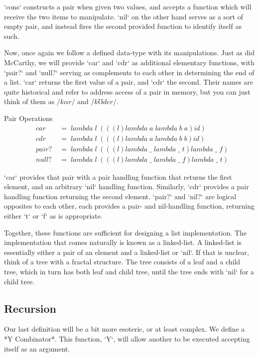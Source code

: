 `cons` constructs a pair when given two values, and accepts a function which will 
receive the two items to manipulate. `nil` on the other hand serves as a sort of 
empty pair, and instead fires the second provided function to identify itself as 
such.

Now, once again we follow a defined data-type with its manipulations. Just as did 
McCarthy, we will provide `car` and `cdr` as additional elementary functions, with 
`pair?` and `null?` serving as complements to each other in determining the end of 
a list. `car` returns the first value of a pair, and `cdr` the second. Their names 
are quite historical and refer to address access of a pair in memory, but you can 
just think of them as $/k \alpha r/$ and $/k \mho d e r/$.

Pair Operations
\begin{align*}
& car \; &= \; lambda \; l \; (((l)lambda \; a \; lambda \; b \; a)id)
\\& cdr \; &= \; lambda \; l \; (((l)lambda \; a \; lambda \; b \; b)id)
\\& pair? \; &= \; lambda \; l \; (((l)lambda \; \_ \; lambda \; \_ \; t)lambda \; \_ \; f)
\\& null? \; &= \; lambda \; l \; (((l)lambda \; \_ \; lambda \; \_ \; f)lambda \; \_ \; t)
\end{align*}

`car` provides that pair with a pair handling function that returns the first 
element, and an arbitrary `nil` handling function. Similarly, `cdr` provides a 
pair handling function returning the second element. `pair?` and `nil?` are 
logical opposites to each other, each provides a pair- and nil-handling function, 
returning either `t` or `f` as is appropriate.

Together, these functions are sufficient for designing a list implementation. The 
implementation that comes naturally is known as a linked-list. A linked-list is 
essentially either a pair of an element and a linked-list or `nil`. If that is 
unclear, think of a tree with a fractal structure. The tree consists of a leaf and 
a child tree, which in turn has both leaf and child tree, until the tree ends with 
`nil` for a child tree.

\subsection{Recursion}
Our last definition will be a bit more esoteric, or at least complex. We define a 
*Y Combinator*. This function, `Y`, will allow another to be executed accepting 
itself as an argument.

